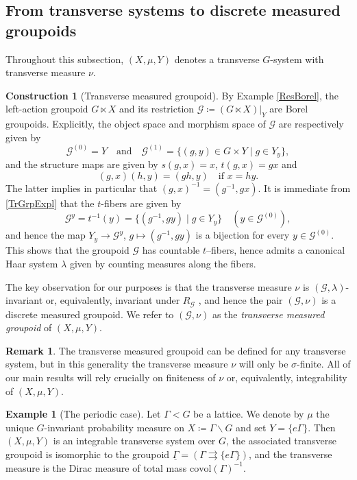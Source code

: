 \documentclass[11pt, oneside]{amsart}
\theoremstyle{definition}
\newtheorem{example}[lemma]{Example}
\newtheorem{con}[lemma]{Construction}
\newtheorem{remark}[lemma]{Remark}
\theoremstyle{remark}
\theoremstyle{TheoremNum}
\newcommand{\cG}{\mathcal{G}}
\newcommand{\qand}{\quad \text{and} \quad}
\begin{document}
\subsection{From transverse systems to discrete measured groupoids}\label{sec:3.2}
Throughout this subsection, $(X, \mu, Y)$ denotes a transverse $G$-system with transverse measure $\nu$.
\begin{con}[Transverse measured groupoid]
By Example \ref{ResBorel}, the left-action groupoid $G \ltimes X$ and its restriction $\cG \coloneqq (G \ltimes X)|_Y$ are Borel groupoids. Explicitly, the object space and morphism space of $\cG$ are respectively given by
\begin{equation}\label{TrGrpExpl}
\cG^{(0)} = Y \qand \cG^{(1)} = \{(g,y) \in G \times Y \mid g \in Y_y\},
\end{equation}
and the structure maps are given by $s(g,x) = x$, $t(g,x) = g x$ and
\[
(g,x)(h,y) =  (gh, y) \quad \text{if } x  = h  y.
\]
The latter implies in particular that $(g,x)^{-1} = (g^{-1}, g x)$. It is immediate from \eqref{TrGrpExpl} that the $t$-fibers are given by
\[
\cG^y =  t^{-1}(y) = \{(g^{-1}, g y) \mid g \in Y_y\} \quad (y \in \cG^{(0)}),
\]
and hence the map $Y_y \to \cG^y$, $g \mapsto (g^{-1}, g y)$ is a bijection for every $y \in \cG^{(0)}$. This shows that the groupoid $\cG$ has countable $t$--fibers, hence admits a canonical Haar system $\lambda$ given by counting measures along the fibers. 

The key observation for our purposes is that the transverse measure $\nu$ is $(\cG, \lambda)$-invariant or, equivalently, invariant under $R_{\cG}$ \cite[Thm.\ 4.3]{ABC}, and hence the pair $(\cG, \nu)$ is a discrete measured groupoid. We refer to $(\cG, \nu)$ as the \emph{transverse measured groupoid} of $(X, \mu, Y)$.
\end{con}
\begin{remark} The transverse measured groupoid can be defined for any transverse system, but in this generality the transverse measure $\nu$ will only be $\sigma$-finite. All of our main results will rely crucially on finiteness of $\nu$ or, equivalently, integrability of $(X, \mu, Y)$.
\end{remark}
\begin{example}[The periodic case]\label{LatticeCase} 
  Let $\Gamma < G$ be a lattice. We denote by $\mu$ the unique $G$-invariant probability measure on $X \coloneqq \Gamma \backslash G$ and set $Y = \{e\Gamma\}$. Then $(X, \mu, Y)$ is an integrable transverse system over $G$, the associated transverse groupoid is isomorphic to the groupoid $\underline{\Gamma} = (\Gamma \rightrightarrows \{e\Gamma\})$, and the transverse measure is the Dirac measure of total mass $\text{covol}(\Gamma)^{-1}$.
\end{example}
\end{document}
